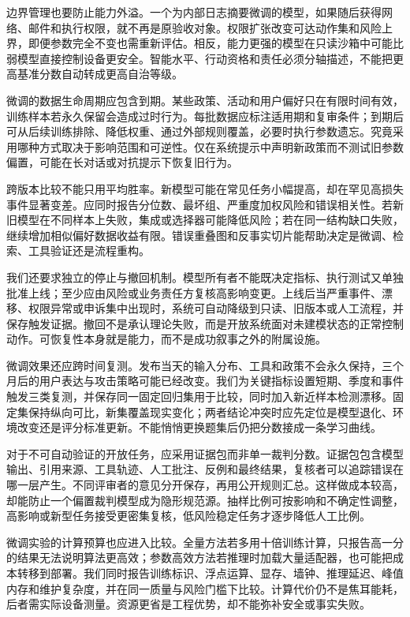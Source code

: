边界管理也要防止能力外溢。一个为内部日志摘要微调的模型，如果随后获得网络、邮件和执行权限，就不再是原验收对象。权限扩张改变可达动作集和风险上界，即便参数完全不变也需重新评估。相反，能力更强的模型在只读沙箱中可能比弱模型直接控制设备更安全。智能水平、行动资格和责任必须分轴描述，不能把更高基准分数自动转成更高自治等级。

微调的数据生命周期应包含到期。某些政策、活动和用户偏好只在有限时间有效，训练样本若永久保留会造成过时行为。每批数据应标注适用期和复审条件；到期后可从后续训练排除、降低权重、通过外部规则覆盖，必要时执行参数遗忘。究竟采用哪种方式取决于影响范围和可逆性。仅在系统提示中声明新政策而不测试旧参数偏置，可能在长对话或对抗提示下恢复旧行为。

跨版本比较不能只用平均胜率。新模型可能在常见任务小幅提高，却在罕见高损失事件显著变差。应同时报告分位数、最坏组、严重度加权风险和错误相关性。若新旧模型在不同样本上失败，集成或选择器可能降低风险；若在同一结构缺口失败，继续增加相似偏好数据收益有限。错误重叠图和反事实切片能帮助决定是微调、检索、工具验证还是流程重构。

我们还要求独立的停止与撤回机制。模型所有者不能既决定指标、执行测试又单独批准上线；至少应由风险或业务责任方复核高影响变更。上线后当严重事件、漂移、权限异常或申诉集中出现时，系统可自动降级到只读、旧版本或人工流程，并保存触发证据。撤回不是承认理论失败，而是开放系统面对未建模状态的正常控制动作。可恢复性本身就是能力，而不是成功叙事之外的附属设施。

微调效果还应跨时间复测。发布当天的输入分布、工具和政策不会永久保持，三个月后的用户表达与攻击策略可能已经改变。我们为关键指标设置短期、季度和事件触发三类复测，并保存同一固定回归集用于比较，同时加入新近样本检测漂移。固定集保持纵向可比，新集覆盖现实变化；两者结论冲突时应先定位是模型退化、环境改变还是评分标准更新。不能悄悄更换题集后仍把分数接成一条学习曲线。

对于不可自动验证的开放任务，应采用证据包而非单一裁判分数。证据包包含模型输出、引用来源、工具轨迹、人工批注、反例和最终结果，复核者可以追踪错误在哪一层产生。不同评审者的意见分开保存，再用公开规则汇总。这样做成本较高，却能防止一个偏置裁判模型成为隐形规范源。抽样比例可按影响和不确定性调整，高影响或新型任务接受更密集复核，低风险稳定任务才逐步降低人工比例。

微调实验的计算预算也应进入比较。全量方法若多用十倍训练计算，只报告高一分的结果无法说明算法更高效；参数高效方法若推理时加载大量适配器，也可能把成本转移到部署。我们同时报告训练标识、浮点运算、显存、墙钟、推理延迟、峰值内存和维护复杂度，并在同一质量与风险门槛下比较。计算代价仍不是焦耳能耗，后者需实际设备测量。资源更省是工程优势，却不能弥补安全或事实失败。

